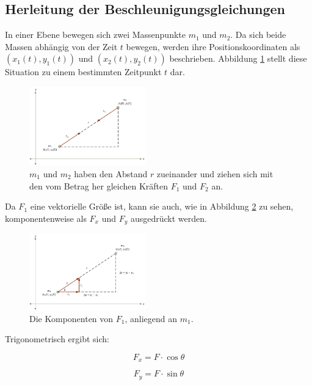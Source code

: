 \documentclass[10pt,twocolumn]{scrartcl}
\begin{document}
\subsection{Herleitung der Beschleunigungsgleichungen}
In einer Ebene bewegen sich zwei Massenpunkte $m_1$ und $m_2$. Da sich beide Massen abhängig von der Zeit $t$ bewegen, werden ihre Positionskoordinaten als $(x_1(t), y_1(t))$ und $(x_2(t), y_2(t))$ beschrieben. Abbildung \ref{fig:abb1} stellt diese Situation zu einem bestimmten Zeitpunkt $t$ dar.

\begin{figure}[t]
\centering
\includegraphics[width=0.45\textwidth]{Bilder/abb1.png}
\caption{$m_1$ und $m_2$ haben den Abstand $r$ zueinander und ziehen sich mit den vom Betrag her gleichen Kräften $F_1$ und $F_2$ an. \cite{MicrosoftOJ}}
\label{fig:abb1}
\end{figure}

Da $F_1$ eine vektorielle Größe ist, kann sie auch, wie in Abbildung \ref{fig:abb2} zu sehen, komponentenweise als $F_x$ und $F_y$ ausgedrückt werden.

\begin{figure}[t]
\centering
\includegraphics[width=0.45\textwidth]{Bilder/abb2.png}
\caption{Die Komponenten von $F_1$, anliegend an $m_1$. \cite{MicrosoftOJ}}
\label{fig:abb2}
\end{figure}

Trigonometrisch ergibt sich:

\begin{equation}F_x = F \cdot \cos \theta
\label{eq:2}
\end{equation}

\begin{equation}F_y = F \cdot \sin \theta
\label{eq:3}
\end{equation}
\end{document}
